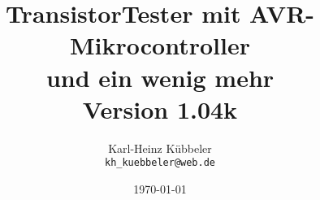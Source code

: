 \documentclass[pdftex,12pt,a4paper,oneside,english]{report}
\begin{document}
\title{TransistorTester mit AVR-Mikrocontroller \\
und ein wenig mehr\\
Version 1.04k \\
}
\author{Karl-Heinz Kübbeler\\
\texttt{kh\_kuebbeler@web.de}}
\date{\today}
\maketitle
\tableofcontents













 
 
 
 
 




\end{document}

